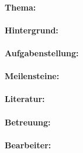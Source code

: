 \begin{center}
\Huge \bf \thethesis
\end{center}



\paragraph{Thema:}


 
\paragraph{Hintergrund:}


 
\paragraph{Aufgabenstellung:}
 


\paragraph{Meilensteine:}



\paragraph{Literatur:}



\paragraph{Betreuung:} 



\paragraph{Bearbeiter:}
